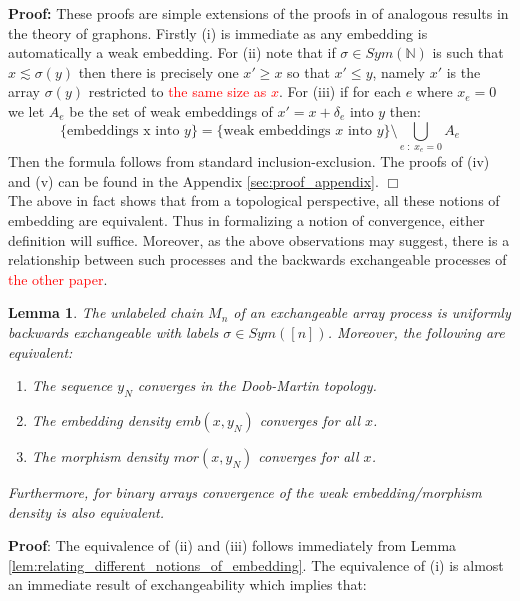 \documentclass[11pt,oneside,reqno]{article}
\theoremstyle{plain}
\newtheorem{lemma}[theorem]{Lemma}
\theoremstyle{definition}
\numberwithin{equation}{section}
\renewcommand{\cite}{\citet}
\renewcommand{\leq}{\leqslant}
\renewcommand{\geq}{\geqslant}
\newcommand{\N}{\mathbb{N}}
\newcommand{\red}{\textcolor{red}}
\begin{document}
\noindent \textbf{Proof:} These proofs are simple extensions of the proofs in \cite{Meliot2024} of analogous results in the theory of graphons. Firstly (i) is immediate as any embedding is automatically a weak embedding. For (ii) note that if $\sigma \in Sym(\N)$ is such that $x \lesssim \sigma(y)$ then there is precisely one $x' \geq x$ so that $x' \leq y$, namely $x'$ is the array $\sigma(y)$ restricted to \red{the same size as $x$}. For (iii) if for each $e$ where $x_e = 0$ we let $A_e$ be the set of weak embeddings of $x' = x + \delta_e$ into $y$ then:
%
\[\{\text{embeddings x into $y$}\} = \{\text{weak embeddings $x$ into $y$}\} \setminus \bigcup_{e \;:\; x_e=0} A_e\]
%
\noindent Then the formula follows from standard inclusion-exclusion. The proofs of (iv) and (v) can be found in the Appendix \ref{sec:proof_appendix}. $\Box$\\

\noindent The above in fact shows that from a topological perspective, all these notions of embedding are equivalent. Thus in formalizing a notion of convergence, either definition will suffice. Moreover, as the above observations may suggest, there is a relationship between such processes and the backwards exchangeable processes of \red{the other paper}.

\begin{lemma}
    The unlabeled chain $M_n$ of an exchangeable array process is uniformly backwards exchangeable with labels $\sigma \in Sym([n])$. Moreover, the following are equivalent:
        \begin{enumerate}[label=(\roman*)]
            \item The sequence $y_N$ converges in the Doob-Martin topology.
            \item The embedding density $emb(x, y_N)$ converges for all $x$.
            \item The morphism density $mor(x, y_N)$ converges for all $x$. 
        \end{enumerate}

    \noindent Furthermore, for binary arrays convergence of the weak embedding/morphism density is also equivalent.

    \label{lem:equivalence_of_dm_and_density_convergence}
\end{lemma}

\noindent \textbf{Proof}: The equivalence of (ii) and (iii) follows immediately from Lemma \ref{lem:relating_different_notions_of_embedding}. The equivalence of (i) is almost an immediate result of exchangeability which implies that:
\end{document}
